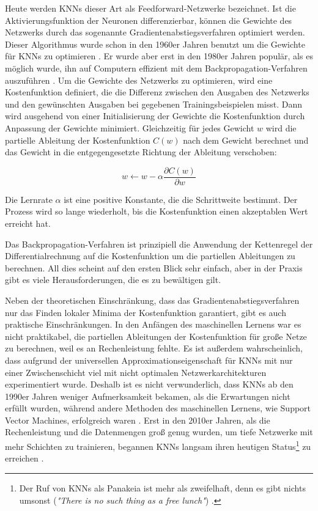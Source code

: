 Heute werden KNNs dieser Art als Feedforward-Netzwerke bezeichnet.
Ist die Aktivierungsfunktion der Neuronen differenzierbar, können die Gewichte des Netzwerks durch das sogenannte Gradientenabstiegsverfahren optimiert werden.
Dieser Algorithmus wurde schon in den 1960er Jahren benutzt um die Gewichte für KNNs zu optimieren \cite{Amari1967}.
Er wurde aber erst in den 1980er Jahren populär, als es möglich wurde, ihn auf Computern effizient mit dem Backpropagation-Verfahren auszuführen \cite{Rumelhart1986}.
Um die Gewichte des Netzwerks zu optimieren, wird eine Kostenfunktion definiert, die die Differenz zwischen den Ausgaben des Netzwerks und den gewünschten Ausgaben bei gegebenen Trainingsbeispielen misst.
Dann wird ausgehend von einer Initialisierung der Gewichte die Kostenfunktion durch Anpassung der Gewichte minimiert.
Gleichzeitig für jedes Gewicht $w$ wird die partielle Ableitung der Kostenfunktion $C(w)$ nach dem Gewicht berechnet und das Gewicht in die entgegengesetzte Richtung der Ableitung verschoben:

$$
w \leftarrow w - \alpha \frac{\partial C(w)}{\partial w}
$$

Die Lernrate $\alpha$ ist eine positive Konstante, die die Schrittweite bestimmt.
Der Prozess wird so lange wiederholt, bis die Kostenfunktion einen akzeptablen Wert erreicht hat.

Das Backpropagation-Verfahren ist prinzipiell die Anwendung der Kettenregel der Differentialrechnung auf die Kostenfunktion um die partiellen Ableitungen zu berechnen.
All dies scheint auf den ersten Blick sehr einfach, aber in der Praxis gibt es viele Herausforderungen, die es zu bewältigen gilt.

Neben der theoretischen Einschränkung, dass das Gradientenabstiegsverfahren nur das Finden lokaler Minima der Kostenfunktion garantiert, gibt es auch praktische Einschränkungen.
In den Anfängen des maschinellen Lernens war es nicht praktikabel, die partiellen Ableitungen der Kostenfunktion für große Netze zu berechnen, weil es an Rechenleistung fehlte.
Es ist außerdem wahrscheinlich, dass aufgrund der universellen Approximationseigenschaft für KNNs mit nur einer Zwischenschicht viel mit nicht optimalen Netzwerkarchitekturen experimentiert wurde.
Deshalb ist es nicht verwunderlich, dass KNNs ab den 1990er Jahren weniger Aufmerksamkeit bekamen, als die Erwartungen nicht erfüllt wurden, während andere Methoden des maschinellen Lernens, wie Support Vector Machines, erfolgreich waren \cite{Schmidhuber2015}.
Erst in den 2010er Jahren, als die Rechenleistung und die Datenmengen groß genug wurden, um tiefe Netzwerke mit mehr Schichten zu trainieren, begannen KNNs langsam ihren heutigen Status\footnote{Der Ruf von KNNs als Panakeia ist mehr als zweifelhaft, denn \glqq es gibt nichts umsonst\grqq{} (\textit{"There is no such thing as a free lunch"}) \cite{NoFreeLunch}.} zu erreichen \cite{Schmidhuber2015}.

